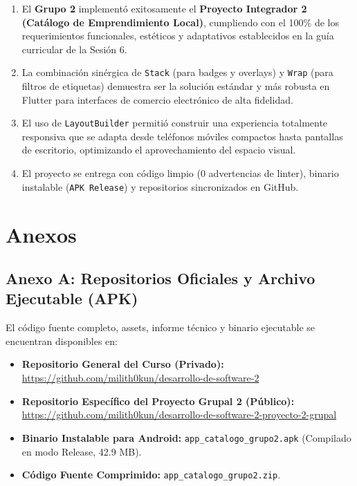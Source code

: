 \documentclass[12pt,a4paper]{article}
\begin{document}
\begin{enumerate}[leftmargin=*]
    \item El \textbf{Grupo 2} implementó exitosamente el \textbf{Proyecto Integrador 2 (Catálogo de Emprendimiento Local)}, cumpliendo con el 100\% de los requerimientos funcionales, estéticos y adaptativos establecidos en la guía curricular de la Sesión 6.
    \item La combinación sinérgica de \texttt{Stack} (para badges y overlays) y \texttt{Wrap} (para filtros de etiquetas) demuestra ser la solución estándar y más robusta en Flutter para interfaces de comercio electrónico de alta fidelidad.
    \item El uso de \texttt{LayoutBuilder} permitió construir una experiencia totalmente responsiva que se adapta desde teléfonos móviles compactos hasta pantallas de escritorio, optimizando el aprovechamiento del espacio visual.
    \item El proyecto se entrega con código limpio (0 advertencias de linter), binario instalable (\texttt{APK Release}) y repositorios sincronizados en GitHub.
\end{enumerate}

\section{Anexos}

\subsection{Anexo A: Repositorios Oficiales y Archivo Ejecutable (APK)}
El código fuente completo, assets, informe técnico y binario ejecutable se encuentran disponibles en:
\begin{itemize}[leftmargin=*]
    \item \textbf{Repositorio General del Curso (Privado):} \url{https://github.com/milith0kun/desarrollo-de-software-2}
    \item \textbf{Repositorio Específico del Proyecto Grupal 2 (Público):} \url{https://github.com/milith0kun/desarrollo-de-software-2-proyecto-2-grupal}
    \item \textbf{Binario Instalable para Android:} \texttt{app\_catalogo\_grupo2.apk} (Compilado en modo Release, 42.9 MB).
    \item \textbf{Código Fuente Comprimido:} \texttt{app\_catalogo\_grupo2.zip}.
\end{itemize}
\end{document}

